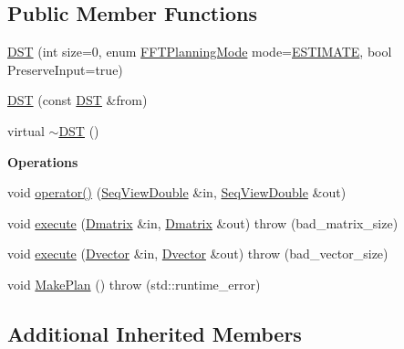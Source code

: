 \subsection*{Public Member Functions}
\begin{DoxyCompactItemize}
\item 
\hyperlink{classtsa_1_1_d_s_t_a903a949ad84aaa3f5ef11e9f08a1abf9}{D\+ST} (int size=0, enum \hyperlink{namespacetsa_a217e07ef78939f88b22c8428ac96b1ae}{F\+F\+T\+Planning\+Mode} mode=\hyperlink{namespacetsa_a217e07ef78939f88b22c8428ac96b1aea2762be66fb6f3e4772c7f4cc162b9750}{E\+S\+T\+I\+M\+A\+TE}, bool Preserve\+Input=true)
\item 
\hyperlink{classtsa_1_1_d_s_t_ac7d9747deee363dbd0d20edc19d0028a}{D\+ST} (const \hyperlink{classtsa_1_1_d_s_t}{D\+ST} \&from)
\item 
virtual \hyperlink{classtsa_1_1_d_s_t_a670a8bae9d3361b5a0e0be7160fee75c}{$\sim$\+D\+ST} ()
\end{DoxyCompactItemize}
\begin{Indent}\textbf{ Operations}\par
\begin{DoxyCompactItemize}
\item 
void \hyperlink{classtsa_1_1_d_s_t_a98927f7365561b6af059465598eb3445}{operator()} (\hyperlink{namespacetsa_ac599574bcc094eda25613724b8f3ca9e}{Seq\+View\+Double} \&in, \hyperlink{namespacetsa_ac599574bcc094eda25613724b8f3ca9e}{Seq\+View\+Double} \&out)
\item 
void \hyperlink{classtsa_1_1_d_s_t_a9bb56b2c2e4b7bff93d06a065903c347}{execute} (\hyperlink{namespacetsa_ad260cd21c1891c4ed391fe788569aba4}{Dmatrix} \&in, \hyperlink{namespacetsa_ad260cd21c1891c4ed391fe788569aba4}{Dmatrix} \&out)  throw (bad\+\_\+matrix\+\_\+size)
\item 
void \hyperlink{classtsa_1_1_d_s_t_a90170687661872523f06360cae3965ff}{execute} (\hyperlink{namespacetsa_a8900fb03d849baf447a1a0efe2561fb2}{Dvector} \&in, \hyperlink{namespacetsa_a8900fb03d849baf447a1a0efe2561fb2}{Dvector} \&out)  throw (bad\+\_\+vector\+\_\+size)
\item 
void \hyperlink{classtsa_1_1_d_s_t_a066a93f3ddbf56f8e5c67067156ebb9a}{Make\+Plan} ()  throw (std\+::runtime\+\_\+error)
\end{DoxyCompactItemize}
\end{Indent}
\subsection*{Additional Inherited Members}


